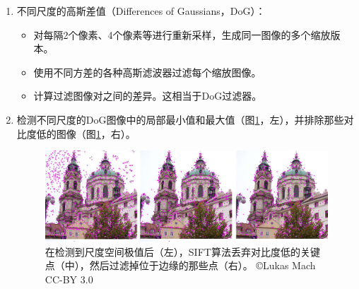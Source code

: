 \begin{enumerate}
\item 不同尺度的高斯差值（Differences of Gaussians，DoG）：

\begin{itemize}

\item 对每隔2个像素、4个像素等进行重新采样，生成同一图像的多个缩放版本。
\item 使用不同方差的各种高斯滤波器过滤每个缩放图像。
\item 计算过滤图像对之间的差异。这相当于DoG过滤器。
\end{itemize}


\item 检测不同尺度的DoG图像中的局部最小值和最大值（图\ref{fig:siftrejection}，左），并排除那些对比度低的图像（图\ref{fig:siftrejection}，右）。

\begin{figure}
	\centering
		\includegraphics[width=\textwidth]{figs/siftrejection.png}
	\caption{在检测到尺度空间极值后（左），SIFT算法丢弃对比度低的关键点（中），然后过滤掉位于边缘的那些点（右）。 \copyright Lukas Mach CC-BY 3.0}
	\label{fig:siftrejection}
\end{figure}


\end{enumerate}
